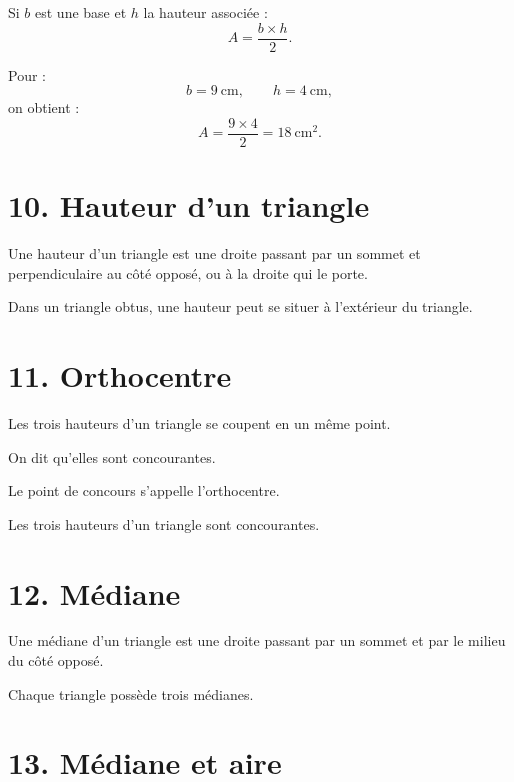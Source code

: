 Si $b$ est une base et $h$ la hauteur associée :
\[
\boxed{A=\dfrac{b\times h}{2}}.
\]

\begin{exemple}
Pour :
\[
b=9\ \text{cm},
\qquad
h=4\ \text{cm},
\]
on obtient :
\[
A=\dfrac{9\times4}{2}=18\ \text{cm}^2.
\]
\end{exemple}

\section{10. Hauteur d'un triangle}

\begin{definition}
Une hauteur d'un triangle est une droite passant par un sommet et perpendiculaire au côté opposé, ou à la droite qui le porte.
\end{definition}


Dans un triangle obtus, une hauteur peut se situer à l'extérieur du triangle.

\section{11. Orthocentre}

Les trois hauteurs d'un triangle se coupent en un même point.

On dit qu'elles sont concourantes.

Le point de concours s'appelle l'orthocentre.

\begin{propriete}
Les trois hauteurs d'un triangle sont concourantes.
\end{propriete}

\section{12. Médiane}

\begin{definition}
Une médiane d'un triangle est une droite passant par un sommet et par le milieu du côté opposé.
\end{definition}

Chaque triangle possède trois médianes.

\section{13. Médiane et aire}

